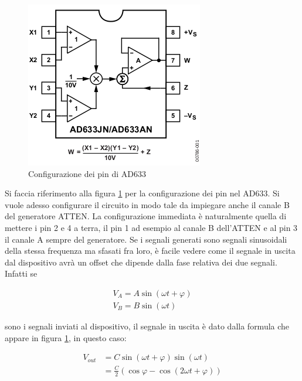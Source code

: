 \documentclass[a4paper]{article}
\begin{document}
\begin{figure}[htp]
\centering
\includegraphics[scale=.6]{pinconf}
\caption{Configurazione dei pin di AD633}
\label{fig:pin}
\end{figure}

Si faccia riferimento alla figura \ref{fig:pin} per la configurazione dei pin nel AD633. Si vuole adesso configurare il circuito in modo tale da impiegare anche il canale B del generatore ATTEN. La configurazione immediata è naturalmente quella di mettere i pin 2 e 4 a terra, il pin 1 ad esempio al canale B dell'ATTEN e al pin 3 il canale A sempre del generatore. Se i segnali generati sono segnali sinusoidali della stessa frequenza ma sfasati fra loro, è facile vedere come il segnale in uscita dal dispositivo avrà un offset che dipende dalla fase relativa dei due segnali. Infatti se

\begin{gather}
V_A = A \sin (\omega t + \varphi) \\
V_B = B \sin (\omega t)
\end{gather}

sono i segnali inviati al dispositivo, il segnale in uscita è dato dalla formula che appare in figura \ref{fig:pin}, in questo caso:

\begin{equation}
\begin{split}
V_{out} & = C \sin (\omega t + \varphi) \sin (\omega t) \\
		& = \frac{C}{2} ( \cos \varphi - \cos (2 \omega t + \varphi))
\end{split}
\end{equation}
\end{document}
